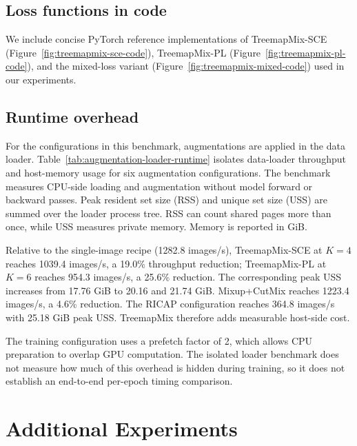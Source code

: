 \subsection{Loss functions in code}
\label{app:loss-code}

We include concise PyTorch reference implementations of TreemapMix-SCE
(Figure~\ref{fig:treemapmix-sce-code}), TreemapMix-PL
(Figure~\ref{fig:treemapmix-pl-code}), and the mixed-loss variant
(Figure~\ref{fig:treemapmix-mixed-code}) used in our experiments.







\subsection{Runtime overhead}
\label{app:runtime-overhead}
For the configurations in this benchmark, augmentations are applied in the data loader.
Table~\ref{tab:augmentation-loader-runtime} isolates data-loader throughput
and host-memory usage for six augmentation configurations. The benchmark
measures CPU-side loading and augmentation without model forward or backward
passes. Peak resident set size (RSS) and unique set size (USS) are summed over
the loader process tree. RSS can count shared pages more than once, while USS
measures private memory. Memory is reported in GiB.

Relative to the single-image recipe (1282.8 images/s), TreemapMix-SCE at
$K=4$ reaches 1039.4 images/s, a 19.0\% throughput reduction;
TreemapMix-PL at $K=6$ reaches 954.3 images/s, a 25.6\% reduction.
The corresponding peak USS increases from 17.76 GiB to 20.16 and 21.74 GiB.
Mixup+CutMix reaches 1223.4 images/s, a 4.6\% reduction.
The RICAP configuration reaches 364.8 images/s with 25.18 GiB peak USS.
TreemapMix therefore adds measurable host-side cost.



The training configuration uses a prefetch factor of 2, which allows CPU
preparation to overlap GPU computation. The isolated loader benchmark does
not measure how much of this overhead is hidden during training, so it does
not establish an end-to-end per-epoch timing comparison.

\clearpage
\section{Additional Experiments}
